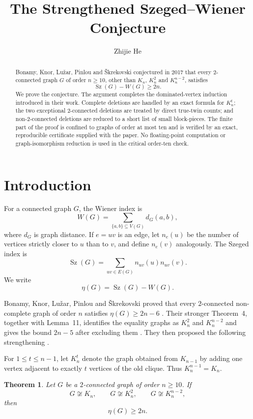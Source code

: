 \documentclass[11pt,reqno]{amsart}
\title{The Strengthened Szeged--Wiener Conjecture}
\author{Zhijie He}
\date{}
\newtheorem{theorem}{Theorem}[section]
\theoremstyle{definition}
\theoremstyle{remark}
\newcommand{\Sz}{\operatorname{Sz}}
\begin{document}
\begin{abstract}
Bonamy, Knor, Lu\v{z}ar, Pinlou and \v{S}krekovski conjectured in 2017 that every
$2$-connected graph $G$ of order $n\ge 10$, other than $K_n$, $K_n^2$ and
$K_n^{n-2}$, satisfies
\[
  \Sz(G)-W(G)\ge 2n.
\]
We prove the conjecture.  The argument completes the dominated-vertex induction
introduced in their work.  Complete deletions are handled by an exact formula for
$K_n^t$; the two exceptional $2$-connected deletions are treated by direct
true-twin counts; and non-$2$-connected deletions are reduced to a short list of
small block-pieces.  The finite part of the proof is confined to graphs of order at
most ten and is verified by an exact, reproducible certificate supplied with the
paper.  No floating-point computation or graph-isomorphism reduction is used in the
critical order-ten check.
\end{abstract}

\maketitle

\section{Introduction}

For a connected graph $G$, the Wiener index is
\[
  W(G)=\sum_{\{a,b\}\subseteq V(G)} d_G(a,b),
\]
where $d_G$ is graph distance.  If $e=uv$ is an edge, let $n_e(u)$ be the
number of vertices strictly closer to $u$ than to $v$, and define $n_e(v)$
analogously.  The Szeged index is
\[
  \Sz(G)=\sum_{uv\in E(G)} n_{uv}(u)n_{uv}(v).
\]
We write
\[
  \eta(G)=\Sz(G)-W(G).
\]

Bonamy, Knor, Lu\v{z}ar, Pinlou and \v{S}krekovski proved that every
$2$-connected non-complete graph of order $n$ satisfies
\(\eta(G)\ge 2n-6\) \cite[Theorem~2]{BKLPS}.  Their stronger
Theorem~4, together with Lemma~11, identifies the equality graphs as
$K_n^2$ and $K_n^{n-2}$ and gives the bound $2n-5$ after excluding them
\cite[Theorem~4 and Lemma~11]{BKLPS}.  They then proposed the following
strengthening \cite[Conjecture~5]{BKLPS}.

For $1\le t\le n-1$, let $K_n^t$ denote the graph obtained from $K_{n-1}$ by
adding one vertex adjacent to exactly $t$ vertices of the old clique.  Thus
$K_n^{n-1}=K_n$.

\begin{theorem}\label{thm:main}
Let $G$ be a $2$-connected graph of order $n\ge 10$.  If
\[
  G\not\cong K_n,\qquad G\not\cong K_n^2,\qquad
  G\not\cong K_n^{n-2},
\]
then
\[
  \eta(G)\ge 2n.
\]
\end{theorem}
\end{document}
